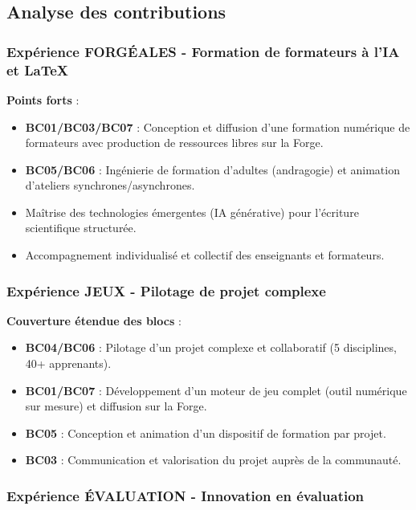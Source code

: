 \subsection{Analyse des contributions}

\subsubsection{Expérience FORGÉALES - Formation de formateurs à l'IA et \LaTeX{}}

\textbf{Points forts} :
\begin{itemize}[leftmargin=*]
    \item \textbf{BC01/BC03/BC07} : Conception et diffusion d'une formation numérique de formateurs avec production de ressources libres sur la Forge.
    \item \textbf{BC05/BC06} : Ingénierie de formation d'adultes (andragogie) et animation d'ateliers synchrones/asynchrones.
    \item Maîtrise des technologies émergentes (IA générative) pour l'écriture scientifique structurée.
    \item Accompagnement individualisé et collectif des enseignants et formateurs.
\end{itemize}

\subsubsection{Expérience JEUX - Pilotage de projet complexe}

\textbf{Couverture étendue des blocs} :
\begin{itemize}[leftmargin=*]
    \item \textbf{BC04/BC06} : Pilotage d'un projet complexe et collaboratif (5 disciplines, 40+ apprenants).
    \item \textbf{BC01/BC07} : Développement d'un moteur de jeu complet (outil numérique sur mesure) et diffusion sur la Forge.
    \item \textbf{BC05} : Conception et animation d'un dispositif de formation par projet.
    \item \textbf{BC03} : Communication et valorisation du projet auprès de la communauté.
\end{itemize}

\subsubsection{Expérience ÉVALUATION - Innovation en évaluation}

